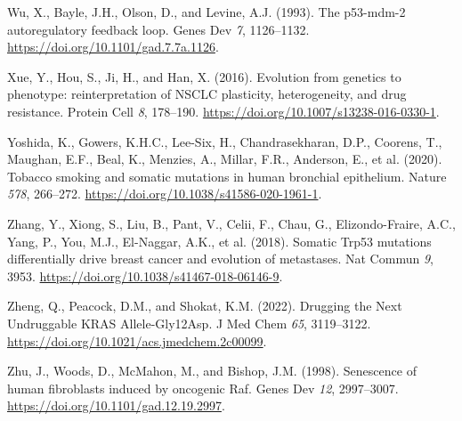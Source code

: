 \begin{CSLReferences}{0}{0}
\leavevmode{}%
Wu, X., Bayle, J.H., Olson, D., and Levine, A.J. (1993). The p53-mdm-2 autoregulatory feedback loop. Genes Dev \emph{7}, 1126--1132. \url{https://doi.org/10.1101/gad.7.7a.1126}.

\leavevmode{}%
Xue, Y., Hou, S., Ji, H., and Han, X. (2016). Evolution from genetics to phenotype: reinterpretation of NSCLC plasticity, heterogeneity, and drug resistance. Protein Cell \emph{8}, 178--190. \url{https://doi.org/10.1007/s13238-016-0330-1}.

\leavevmode{}%
Yoshida, K., Gowers, K.H.C., Lee-Six, H., Chandrasekharan, D.P., Coorens, T., Maughan, E.F., Beal, K., Menzies, A., Millar, F.R., Anderson, E., et al. (2020). Tobacco smoking and somatic mutations in human bronchial epithelium. Nature \emph{578}, 266--272. \url{https://doi.org/10.1038/s41586-020-1961-1}.

\leavevmode{}%
Zhang, Y., Xiong, S., Liu, B., Pant, V., Celii, F., Chau, G., Elizondo-Fraire, A.C., Yang, P., You, M.J., El-Naggar, A.K., et al. (2018). Somatic Trp53 mutations differentially drive breast cancer and evolution of metastases. Nat Commun \emph{9}, 3953. \url{https://doi.org/10.1038/s41467-018-06146-9}.

\leavevmode{}%
Zheng, Q., Peacock, D.M., and Shokat, K.M. (2022). Drugging the Next Undruggable KRAS Allele-Gly12Asp. J Med Chem \emph{65}, 3119--3122. \url{https://doi.org/10.1021/acs.jmedchem.2c00099}.

\leavevmode{}%
Zhu, J., Woods, D., McMahon, M., and Bishop, J.M. (1998). Senescence of human fibroblasts induced by oncogenic Raf. Genes Dev \emph{12}, 2997--3007. \url{https://doi.org/10.1101/gad.12.19.2997}.

\end{CSLReferences}
